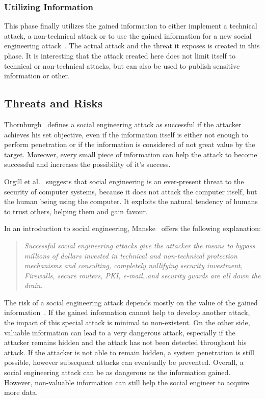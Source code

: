 \subsubsection{Utilizing Information}

This phase finally utilizes the gained information to either implement a
technical attack, a non-technical attack or to use the gained information for a
new social engineering attack~\cite{thornburgh2004}. The actual attack and the
threat it exposes is created in this phase. It is interesting that the attack
created here does not limit itself to technical or non-technical attacks, but
can also be used to publish sensitive information or other.

\subsection{Threats and Risks}

Thornburgh~\cite{thornburgh2004} defines a social engineering attack as
successful if the attacker achieves his set objective, even if the information
itself is either not enough to perform penetration or if the information is
considered of not great value by the target. Moreover, every small piece of
information can help the attack to become successful and increases the
possibility of it's success.

Orgill et al.~\cite{orgill2004} suggests that social engineering is an ever-present
threat to the security of computer systems, because it does not attack the
computer itself, but the human being using the computer. It exploits the
natural tendency of humans to trust others, helping them and gain favour.

In an introduction to social engineering, Manske~\cite{manske2000} offers the
following explanation:

\begin{quote}
\textit{Successful social engineering attacks give the attacker the means to bypass
millions of dollars invested in technical and non-technical protection
mechanisms and consulting, completely nullifying security investment,
Firewalls, secure routers, PKI, e-mail\dots and security guards are all down
the drain.}
\end{quote}

The risk of a social engineering attack depends mostly on the value of the
gained information~\cite{thornburgh2004}. If the gained information cannot help
to develop another attack, the impact of this special attack is minimal to
non-existent. On the other side, valuable information can lead to a very
dangerous attack, especially if the attacker remains hidden and the attack has
not been detected throughout his attack. If the attacker is not able to remain
hidden, a system penetration is still possible, however subsequent attacks can
eventually be prevented. Overall, a social engineering attack can be as dangerous
as the information gained. However, non-valuable information can still help the
social engineer to acquire more data.

